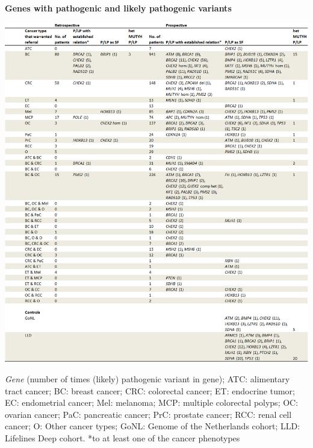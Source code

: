 \begin{table}
	\caption[Genes with pathogenic and likely pathogenic variants]{\textbf{Genes with pathogenic and likely pathogenic variants}}
	\includegraphics[width=1.0\linewidth]{img/opportunistic_screening_Table3}
		\caption*{\footnotesize{\textsl{Gene} (number of times (likely) pathogenic variant in gene); ATC: alimentary tract cancer; BC: breast cancer; CRC: colorectal cancer; ET: endocrine tumor; EC: endometrial cancer; Mel: melanoma; MCP: multiple colorectal polyps; OC: ovarian cancer; PaC: pancreatic cancer; PrC: prostate cancer; RCC: renal cell cancer; O: Other cancer types; GoNL: Genome of the Netherlands cohort; LLD: Lifelines Deep cohort. *to at least one of the cancer phenotypes}}
	\label{table:screening_table3}
\end{table}

